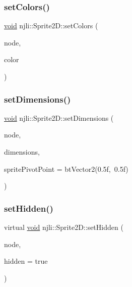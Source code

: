 \mbox{\label{classnjli_1_1_sprite2_d_ad8e90cd6c323796e293a883b10a67681}} 
\subsubsection{\texorpdfstring{set\+Colors()}{setColors()}\hspace{0.1cm}{\footnotesize\ttfamily [2/2]}}
{\footnotesize\ttfamily \mbox{\hyperlink{_thread_8h_af1e856da2e658414cb2456cb6f7ebc66}{void}} njli\+::\+Sprite2\+D\+::set\+Colors (\begin{DoxyParamCaption}\item[{\mbox{\hyperlink{classnjli_1_1_node}{Node}} $\ast$}]{node,  }\item[{const bt\+Vector4 \&}]{color }\end{DoxyParamCaption})}

\mbox{\label{classnjli_1_1_sprite2_d_a1df32861ec578642d7e92c77f6b886f2}} 
\subsubsection{\texorpdfstring{set\+Dimensions()}{setDimensions()}}
{\footnotesize\ttfamily \mbox{\hyperlink{_thread_8h_af1e856da2e658414cb2456cb6f7ebc66}{void}} njli\+::\+Sprite2\+D\+::set\+Dimensions (\begin{DoxyParamCaption}\item[{\mbox{\hyperlink{classnjli_1_1_node}{Node}} $\ast$}]{node,  }\item[{const bt\+Vector2 \&}]{dimensions,  }\item[{const bt\+Vector2 \&}]{sprite\+Pivot\+Point = {\ttfamily btVector2(0.5f,~0.5f)} }\end{DoxyParamCaption})}

\mbox{\label{classnjli_1_1_sprite2_d_a67ddaace4a3a936408068657d617a64f}} 
\subsubsection{\texorpdfstring{set\+Hidden()}{setHidden()}}
{\footnotesize\ttfamily virtual \mbox{\hyperlink{_thread_8h_af1e856da2e658414cb2456cb6f7ebc66}{void}} njli\+::\+Sprite2\+D\+::set\+Hidden (\begin{DoxyParamCaption}\item[{\mbox{\hyperlink{classnjli_1_1_node}{Node}} $\ast$}]{node,  }\item[{bool}]{hidden = {\ttfamily true} }\end{DoxyParamCaption})\hspace{0.3cm}{\ttfamily [virtual]}}

